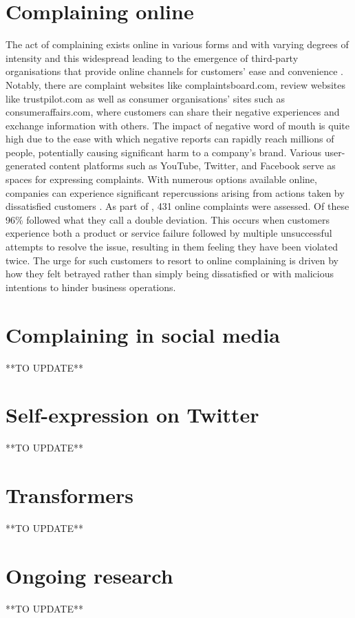 \section{Complaining online}

The act of complaining exists online in various forms and with varying degrees of intensity and this widespread leading to the emergence of third-party organisations that provide online channels for customers' ease and convenience \cite{tripp_when_2011}. Notably, there are complaint websites like complaintsboard.com, review websites like trustpilot.com as well as consumer organisations' sites such as consumeraffairs.com, where customers can share their negative experiences and exchange information with others. The impact of negative word of mouth is quite high due to the ease with which negative reports can rapidly reach millions of people, potentially causing significant harm to a company's brand. Various user-generated content platforms such as YouTube, Twitter, and Facebook serve as spaces for expressing complaints. With numerous options available online, companies can experience significant repercussions arising from actions taken by dissatisfied customers \cite{tripp_when_2011}.
\newline \newline
As part of \cite{tripp_when_2011}, 431 online complaints were assessed. Of these 96\% followed what they call a double deviation. This occurs when customers experience both a product or service failure followed by multiple unsuccessful attempts to resolve the issue, resulting in them feeling they have been violated twice. The urge for such customers to resort to online complaining is driven by how they felt betrayed rather than simply being dissatisfied or with malicious intentions to hinder business operations.

\section{Complaining in social media}
**TO UPDATE**

\section{Self-expression on Twitter}
**TO UPDATE**

\section{Transformers}
**TO UPDATE**

\section{Ongoing research}
**TO UPDATE**
